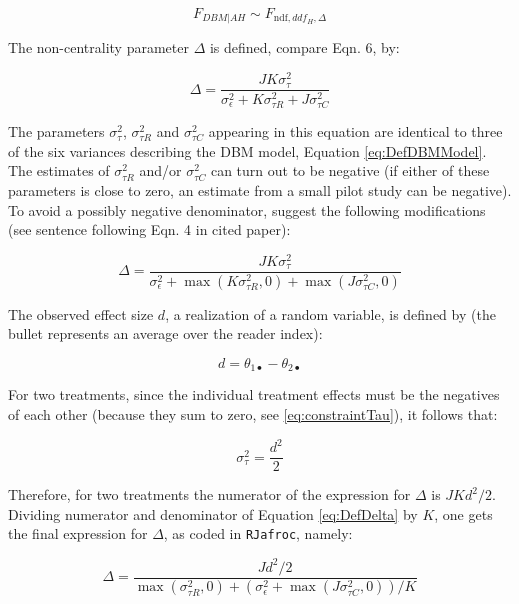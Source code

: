\documentclass[
]{book}
\begin{document}
\begin{equation}
F_{DBM|AH} \sim F_{\text{ndf},ddf_H,\Delta}
\label{eq:AhDistrDBMFStatRRRC}
\end{equation}

The non-centrality parameter \(\Delta\) is defined, compare \citep{RN1476} Eqn. 6, by:

\begin{equation*}
\Delta=\frac{JK\sigma_{\tau}^2}{\sigma_{\epsilon}^2+K\sigma_{\tau R}^2+J\sigma_{\tau C}^2}
\end{equation*}

The parameters \(\sigma_{\tau}^2\), \(\sigma_{\tau R}^2\) and \(\sigma_{\tau C}^2\) appearing in this equation are identical to three of the six variances describing the DBM model, Equation \eqref{eq:DefDBMModel}. The estimates of \(\sigma_{\tau R}^2\) and/or \(\sigma_{\tau C}^2\) can turn out to be negative (if either of these parameters is close to zero, an estimate from a small pilot study can be negative). To avoid a possibly negative denominator, \citep{RN1476} suggest the following modifications (see sentence following Eqn. 4 in cited paper):

\begin{equation}
\Delta=\frac{JK\sigma_{\tau}^2}{\sigma_{\epsilon}^2+\max(K\sigma_{\tau R}^2,0)+\max(J\sigma_{\tau C}^2,0)}
\label{eq:DefDelta}
\end{equation}

The observed effect size \(d\), a realization of a random variable, is defined by (the bullet represents an average over the reader index):

\begin{equation}
d=\theta_{1\bullet}-\theta_{2\bullet}
\label{eq:EffectSize}
\end{equation}

For two treatments, since the individual treatment effects must be the negatives of each other (because they sum to zero, see \eqref{eq:constraintTau}), it follows that:

\begin{equation}
\sigma_{\tau}^2=\frac{d^2}{2}
\label{eq:sigma2Tau}
\end{equation}

Therefore, for two treatments the numerator of the expression for \(\Delta\) is \(JKd^2/2\). Dividing numerator and denominator of Equation \eqref{eq:DefDelta} by \(K\), one gets the final expression for \(\Delta\), as coded in \texttt{RJafroc}, namely:

\begin{equation}
\Delta=\frac{Jd^2/2}{\max(\sigma_{\tau R}^2,0)+(\sigma_{\epsilon}^2+\max(J\sigma_{\tau C}^2,0))/K}
\label{eq:DeltaCoded}
\end{equation}
\end{document}
